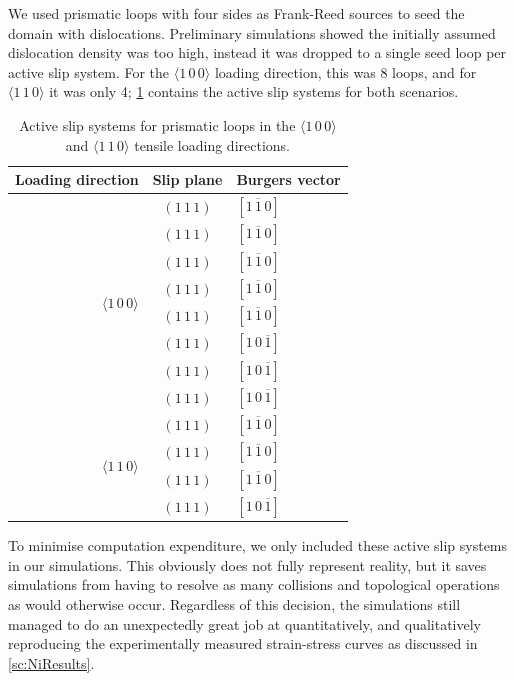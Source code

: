 We used prismatic loops with four sides as Frank-Reed sources to seed the domain with dislocations. Preliminary simulations showed the initially assumed dislocation density was too high, instead it was dropped to a single seed loop per active slip system. For the $\langle 1\, 0\, 0 \rangle$ loading direction, this was 8 loops, and for $\langle 1\, 1\, 0 \rangle$ it was only 4; \cref{t:slipSystems} contains the active slip systems for both scenarios.
\begin{table}
    \centering
    \caption{Active slip systems for prismatic loops in the $\langle 1\, 0\, 0 \rangle$ and $\langle 1\, 1\, 0 \rangle$ tensile loading directions.}
    \label{t:slipSystems}
    \begin{tabular}{rcl}
        \toprule
        Loading direction                            & Slip plane    & Burgers vector           \\
        \midrule
        \multirow{8}{*}{$\langle 1\, 0\, 0 \rangle$} & $(1\, 1\, 1)$ & $[1\, \overline{1}\, 0]$ \\
                                                     & $(1\, 1\, 1)$ & $[1\, \overline{1}\, 0]$ \\
                                                     & $(1\, 1\, 1)$ & $[1\, \overline{1}\, 0]$ \\
                                                     & $(1\, 1\, 1)$ & $[1\, \overline{1}\, 0]$ \\
                                                     & $(1\, 1\, 1)$ & $[1\, \overline{1}\, 0]$ \\
                                                     & $(1\, 1\, 1)$ & $[1\, 0\, \overline{1}]$ \\
                                                     & $(1\, 1\, 1)$ & $[1\, 0\, \overline{1}]$ \\
                                                     & $(1\, 1\, 1)$ & $[1\, 0\, \overline{1}]$ \\
        \midrule
        \multirow{4}{*}{$\langle 1\, 1\, 0 \rangle$} & $(1\, 1\, 1)$ & $[1\, \overline{1}\, 0]$ \\
                                                     & $(1\, 1\, 1)$ & $[1\, \overline{1}\, 0]$ \\
                                                     & $(1\, 1\, 1)$ & $[1\, \overline{1}\, 0]$ \\
                                                     & $(1\, 1\, 1)$ & $[1\, 0\, \overline{1}]$ \\
        \bottomrule
    \end{tabular}
\end{table}
To minimise computation expenditure, we only included these active slip systems in our simulations. This obviously does not fully represent reality, but it saves simulations from having to resolve as many collisions and topological operations as would otherwise occur. Regardless of this decision, the simulations still managed to do an unexpectedly great job at quantitatively, and qualitatively reproducing the experimentally measured strain-stress curves as discussed in \cref{sc:NiResults}.

